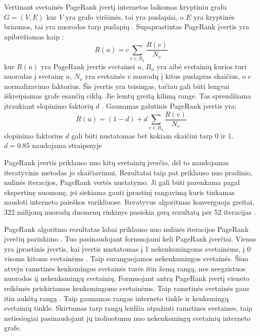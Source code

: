 Vertinant svetainės PageRank įvertį internetas laikomas kryptiniu grafu $G = (V, E)$ kur $V$ yra grafo viršūnės, tai yra puslapiai, o $E$ yra kryptinės briaunos, tai yra nuorodos tarp puslapių \cite{Wu2008}. Supaprastintas PageRank įvertis yra apibrėžiamas kaip \cite{pagerank}:
\begin{equation}
    R(u) = c \sum_{v \in B_u} \frac{R(v)}{N_v}
\end{equation}
kur $R(u)$ yra PageRank įvertis svetainei $u$, $B_u$ yra aibė svetainių kurios turi nuorodas į svetainę $u$, $N_v$ yra svetainės $v$ nuorodų į kitus puslapius skaičius, o $c$ normalizavimo faktorius. Šis įvertis yra teisingas, tačiau gali būti lengvai iškreipiamas grafe esančių ciklų. Jie lemtų greitą kilimą range. Tas sprendžiama įtraukiant slopinimo faktorių $d$ \cite{pagerank}. Gaunamas galutinis PageRank įvertis yra:
\begin{equation}
    R(u) = (1 - d) + d \sum_{v \in B_u} \frac{R(v)}{N_v}
\end{equation}
slopinimo faktorius $d$ gali būti nustatomas bet kokiam skaičiui tarp $0$ ir $1$. $d=0.85$ naudojama straipsnyje \cite{pagerank}

 PageRank įvertis priklauso nuo kitų svetainių įverčio, dėl to naudojamas iteratyvinis metodas jo skaičiavimui. Rezultatai taip pat priklauso nuo pradinio, nulinės iteracijos, PageRank vertės nustatymo. Ji gali būti parenkama pagal ekspertinę nuomonę, jei siekiama gauti įprastinį rangavimą kuris tinkamas naudoti interneto paieškos varikliuose.  Iteratyvus algoritmas konverguoja greitai, 322 milijonų nuorodų duomenų rinkinys pasiekia gerą rezultatą per 52 iteracijas \cite{pagerank}.

 PageRank algoritmo rezultatas labai priklauso nuo nulinės iteracijos PageRank įverčių parinkimo \cite{linchpins}. Tuo pasinaudojant formuojami keli PageRank įverčiai. Vienas yra įprastinis įvertis, kai įvertis nustatomas į 1 nekenksmingoms svetainėms, į 0 visoms kitoms svetainėms \cite{linchpins}. Taip suranguojamos nekenksmingos svetainės. Šiuo atveju ramstinės kenksmingos svetainės turės itin žemą rangą, nes neegzistuos nuorodos iį nekenksmingų svetainių. Formuojant antrą PageRank įvertį vieneto reikšmės priskiriamos kenksmingoms svetainėms. Taip ramstinės svetainės gaus itin aukštą rangą \cite{linchpins}. Taip gaunamas rangas interneto tinkle ir kenksmingų svetainių tinkle. Skirtumas tarp rangų leidžia atpažinti ramstines svetaines, taip netiesiogiai pasinaudojant jų izoliuotumu nuo nekenksmingų svetainių interneto grafe.

